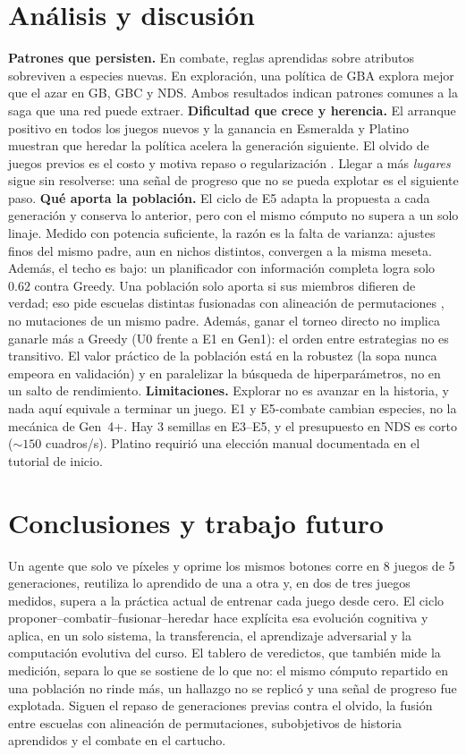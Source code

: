 \documentclass[conference]{IEEEtran}
\begin{document}
\section{Análisis y discusión}
\textbf{Patrones que persisten.} En combate, reglas aprendidas sobre atributos sobreviven a especies nuevas. En exploración, una política de GBA explora mejor que el azar en GB, GBC y NDS. Ambos resultados indican patrones comunes a la saga que una red puede extraer.
\textbf{Dificultad que crece y herencia.} El arranque positivo en todos los juegos nuevos y la ganancia en Esmeralda y Platino muestran que heredar la política acelera la generación siguiente. El olvido de juegos previos es el costo y motiva repaso o regularización \cite{kirkpatrick2017ewc}. Llegar a más \emph{lugares} sigue sin resolverse: una señal de progreso que no se pueda explotar es el siguiente paso.
\textbf{Qué aporta la población.} El ciclo de E5 adapta la propuesta a cada generación y conserva lo anterior, pero con el mismo cómputo no supera a un solo linaje. Medido con potencia suficiente, la razón es la falta de varianza: ajustes finos del mismo padre, aun en nichos distintos, convergen a la misma meseta. Además, el techo es bajo: un planificador con información completa logra solo $0.62$ contra Greedy. Una población solo aporta si sus miembros difieren de verdad; eso pide escuelas distintas fusionadas con alineación de permutaciones \cite{ainsworth2023rebasin}, no mutaciones de un mismo padre. Además, ganar el torneo directo no implica ganarle más a Greedy (U0 frente a E1 en Gen1): el orden entre estrategias no es transitivo. El valor práctico de la población está en la robustez (la sopa nunca empeora en validación) y en paralelizar la búsqueda de hiperparámetros, no en un salto de rendimiento.
\textbf{Limitaciones.} Explorar no es avanzar en la historia, y nada aquí equivale a terminar un juego. E1 y E5-combate cambian especies, no la mecánica de Gen~4+. Hay 3 semillas en E3--E5, y el presupuesto en NDS es corto (${\sim}150$ cuadros/s). Platino requirió una elección manual documentada en el tutorial de inicio.

\section{Conclusiones y trabajo futuro}
Un agente que solo ve píxeles y oprime los mismos botones corre en 8 juegos de 5 generaciones, reutiliza lo aprendido de una a otra y, en dos de tres juegos medidos, supera a la práctica actual de entrenar cada juego desde cero. El ciclo proponer--combatir--fusionar--heredar hace explícita esa evolución cognitiva y aplica, en un solo sistema, la transferencia, el aprendizaje adversarial y la computación evolutiva del curso. El tablero de veredictos, que también mide la medición, separa lo que se sostiene de lo que no: el mismo cómputo repartido en una población no rinde más, un hallazgo no se replicó y una señal de progreso fue explotada. Siguen el repaso de generaciones previas contra el olvido, la fusión entre escuelas con alineación de permutaciones, subobjetivos de historia aprendidos y el combate en el cartucho.



\end{document}
